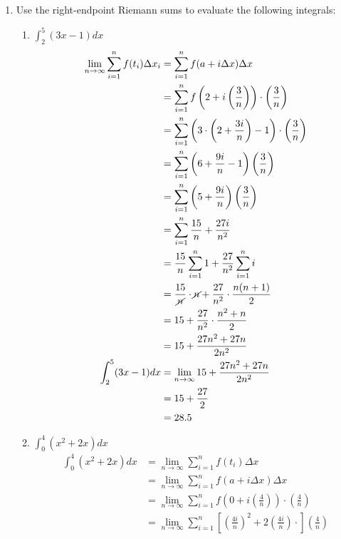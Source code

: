 \documentclass[12pt,letterpaper]{article}
\theoremstyle{case}
\theoremstyle{definition}
\begin{document}
\begin{enumerate}
		\item Use the right-endpoint Riemann sums to evaluate the following integrals:
		\begin{enumerate}
			\item $\int_{2}^{5}(3x-1)dx$
			\begin{align*}
				\lim\limits_{n \to \infty} \sum_{i=1}^{n} f(t_i)\Delta x_i &= \sum_{i=1}^{n} f(a+i\Delta x) \Delta x \\
				&= \sum_{i=1}^{n} f\left(2+i\left(\frac{3}{n}\right)\right)\cdot \left(\frac{3}{n}\right) \\
				&= \sum_{i=1}^{n} \left(3 \cdot \left(2+\frac{3i}{n}\right)-1\right) \cdot \left(\frac{3}{n}\right) \\
				&= \sum_{i=1}^{n} \left(6+\frac{9i}{n}-1\right)\left(\frac{3}{n}\right) \\
				&= \sum_{i=1}^{n}\left(5+\frac{9i}{n}\right)\left(\frac{3}{n}\right) \\
				&= \sum_{i=1}^{n} \frac{15}{n} +\frac{27i}{n^2} \\
				&= \frac{15}{n} \sum_{i=1}^{n} 1 + \frac{27}{n^2} \sum_{i=1}^{n} i \\
				&= \frac{15}{\cancel{n}} \cdot \cancel{n} + \frac{27}{n^2} \cdot \frac{n(n+1)}{2} \\
				&= 15 + \frac{27}{n^2} \cdot \frac{n^2+n}{2} \\
				&= 15 + \frac{27n^2+27n}{2n^2} \\
				\int_{2}^{5} (3x-1)dx &= \lim\limits_{n \to \infty} 15+\frac{27n^2+27n}{2n^2}\\
				&= 15+\frac{27}{2}\\
				&=28.5
			\end{align*}
			\item $\int_{0}^{4} (x^2+2x)dx$
			\begin{align*}
				\int_{0}^{4} (x^2+2x)dx &= \lim\limits_{n \to \infty} \sum_{i=1}^{n} f(t_i)\Delta x \\
				&= \lim\limits_{n \to \infty} \sum_{i=1}^{n} f\left(a+i\Delta x\right) \Delta x \\
				&= \lim\limits_{n \to \infty} \sum_{i=1}^{n} f\left(0+i\left(\frac{4}{n}\right)\right)\cdot \left(\frac{4}{n}\right) \\
				&= \lim\limits_{n \to \infty} \sum_{i=1}^{n} \left[\left(\frac{4i}{n}\right)^2+2\left(\frac{4i}{n}\right) \cdot \right]\left(\frac{4}{n}\right) \\

\end{align*}
\end{enumerate}
\end{enumerate}
\end{document}
